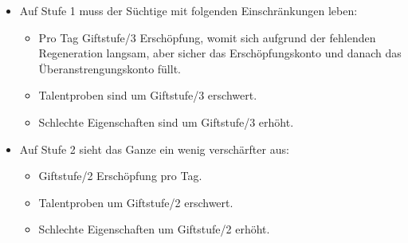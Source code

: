 \begin{itemize}
\begin{itemize}
			\item Auf Stufe 1 muss der Süchtige mit folgenden Einschränkungen leben: 
				\begin{itemize}
					\item Pro Tag Giftstufe/3 Erschöpfung, womit sich aufgrund der fehlenden Regeneration langsam, aber sicher das Erschöpfungskonto und danach das Überanstrengungskonto füllt. 
					\item Talentproben sind um Giftstufe/3 erschwert.
					\item Schlechte Eigenschaften sind um Giftstufe/3 erhöht.
				\end{itemize}
			\item Auf Stufe 2 sieht das Ganze ein wenig verschärfter aus: 
				\begin{itemize}
					\item Giftstufe/2 Erschöpfung pro Tag.
					\item Talentproben um Giftstufe/2 erschwert.
					\item Schlechte Eigenschaften um Giftstufe/2 erhöht.
				\end{itemize}
		\end{itemize}
\end{itemize}

